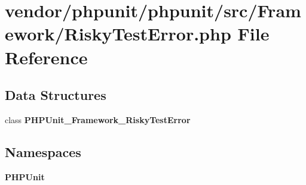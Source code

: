 \section{vendor/phpunit/phpunit/src/\+Framework/\+Risky\+Test\+Error.php File Reference}
\label{_risky_test_error_8php}
\subsection*{Data Structures}
\begin{DoxyCompactItemize}
\item 
class {\bf P\+H\+P\+Unit\+\_\+\+Framework\+\_\+\+Risky\+Test\+Error}
\end{DoxyCompactItemize}
\subsection*{Namespaces}
\begin{DoxyCompactItemize}
\item 
 {\bf P\+H\+P\+Unit}
\end{DoxyCompactItemize}
